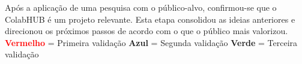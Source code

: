 \appendto{\canvasPrimeiroBloco}{
}

\appendto{\canvasSegundoBloco}{
}

\appendto{\canvasTerceiroBloco}{
}

\appendto{\canvasQuartoBloco}{
}

{
Após a aplicação de uma pesquisa com o público-alvo, confirmou-se que o ColabHUB é um projeto relevante. Esta etapa consolidou as ideias anteriores e direcionou os próximos passos de acordo com o que o público mais valorizou.
}
{
\textcolor{red}{\textbf{Vermelho}} = Primeira validação \quad
\textcolor{blueval}{\textbf{Azul}} = Segunda validação \quad
\textcolor{greenval}{\textbf{Verde}} = Terceira validação
}
